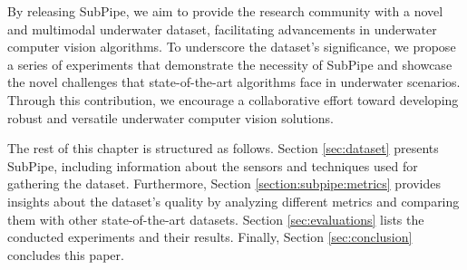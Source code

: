 By releasing SubPipe, we aim to provide the research community with a novel and multimodal underwater dataset, facilitating advancements in underwater computer vision algorithms. To underscore the dataset's significance, we propose a series of experiments that demonstrate the necessity of SubPipe and showcase the novel challenges that state-of-the-art algorithms face in underwater scenarios. Through this contribution, we encourage a collaborative effort toward developing robust and versatile underwater computer vision solutions.

The rest of this chapter is structured as follows. Section \ref{sec:dataset} presents SubPipe, including information about the sensors and techniques used for gathering the dataset. Furthermore, Section \ref{section:subpipe:metrics} provides insights about the dataset's quality by analyzing different metrics and comparing them with other state-of-the-art datasets. Section \ref{sec:evaluations} lists the conducted experiments and their results. Finally, Section \ref{sec:conclusion} concludes this paper.
